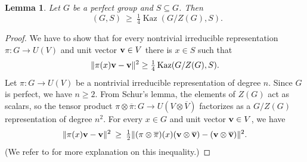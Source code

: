 \documentclass[11pt,reqno]{amsart}
\numberwithin{equation}{section}
\newtheorem{lemma}[theorem]{Lemma}
\theoremstyle{definition}
\theoremstyle{remark}
\newcommand{\Kaz}{\mathop{\mathrm{Kaz}}}
\newcommand{\Kazz}{\mathop{\mathrm{Kaz^*}}}
\begin{document}
	\begin{lemma} \label{lemKazZ}
       Let $G$ be a perfect group and $S \subseteq G$.
       Then
       $$ \Kazz(G,S) \> \geq \> \tfrac{1}{4} \Kaz(G/Z(G),S) . $$
       \end{lemma}
       \begin{proof}
       We have to show that for every nontrivial irreducible representation
       $\pi \colon G \to U(V)$ and unit vector ${\bf v} \in V$
       there is $x \in S$ such that
       $$ \| \pi(x) {\bf v} - {\bf v} \|^2 \geq \tfrac{1}{4} \Kaz(G/Z(G),S) . $$
       Let $\pi \colon G \to U(V)$ be a nontrivial irreducible representation of degree $n$.
       Since $G$ is perfect, we have $n \geq 2$.
       From Schur's lemma, the elements of $Z(G)$ act as scalars, so the tensor product
       $\pi \otimes \overline{\pi} \colon G \to U(V \otimes \overline{V})$
       factorizes as a $G/Z(G)$ representation of degree $n^2$.
       For every $x \in G$ and unit vector ${\bf v} \in V$, we have
      $$
       \| \pi(x) {\bf v} - {\bf v} \|^2 \> \geq \>
       \tfrac{1}{2} \| (\pi \otimes \overline{\pi})(x) ({\bf v} \otimes {\bf \overline{v}}) - ({\bf v} \otimes {\bf \overline{v}}) \|^2 .
       $$
       (We refer to \cite[Lemma~1.7.10]{BHV08} for more explanation on this inequality.)
       

\end{proof}
\end{document}
